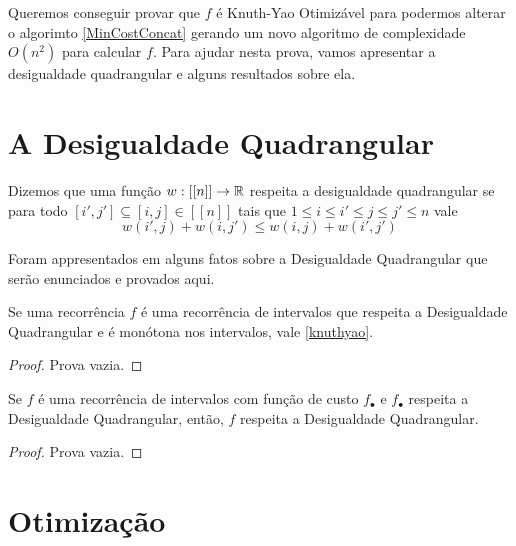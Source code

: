 Queremos conseguir provar que $f$ é Knuth-Yao Otimizável para podermos alterar o algorimto \ref{MinCostConcat} gerando um novo algoritmo de complexidade $O(n^2)$ para calcular $f$. Para ajudar nesta prova, vamos apresentar a desigualdade quadrangular e alguns resultados sobre ela. \\


\section{A Desigualdade Quadrangular}

\begin{defi} \label{qi}
Dizemos que uma função $w : [[n]] \to \mathbb{R}$ respeita a desigualdade quadrangular se para todo  $[i',j'] \subseteq [i,j] \in [[n]]$ tais que $1 \leq i \leq i' \leq j \leq j' \leq n$ vale
$$ w(i',j) + w(i,j') \leq w(i,j) + w(i',j') $$
\end{defi}

Foram appresentados em \cite{Yao:1980} alguns fatos sobre a Desigualdade Quadrangular que serão enunciados e provados aqui.

\begin{theo} \label{qi_to_knuthyao}
Se uma recorrência $f$ é uma recorrência de intervalos que respeita a Desigualdade Quadrangular e é monótona nos intervalos, vale \ref{knuthyao}.
\end{theo}

\begin{proof}
Prova vazia.
\end{proof}

\begin{theo} \label{qi_cost_to_rec}
Se $f$ é uma recorrência de intervalos com função de custo $f_\bullet$ e $f_\bullet$ respeita a Desigualdade Quadrangular, então, $f$ respeita a Desigualdade Quadrangular.
\end{theo}

\begin{proof}
Prova vazia.
\end{proof}


\section{Otimização}

